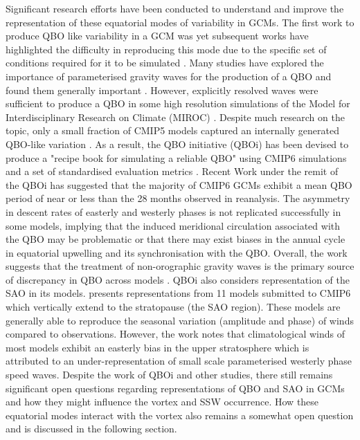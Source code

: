 Significant research efforts have been conducted to understand and improve the representation of these equatorial modes of variability in GCMs. The first work to produce QBO like variability in a GCM was \cite{takahashiSimulation1996} yet subsequent works have highlighted the difficulty in reproducing this mode due to the specific set of conditions required for it to be simulated \citep{Baldwin2001}. Many studies have explored the importance of parameterised gravity waves for the production of a QBO and found them generally important \citep{giorgettaClimatology2006,ospreyClimatology2010b}. However, explicitly resolved waves were sufficient to produce a QBO in some high resolution simulations of the Model for Interdisciplinary Research on Climate (MIROC) \citep{kawataniQuasiBiennial2011}. Despite much research on the topic, only a small fraction of CMIP5 models captured an internally generated QBO-like variation \citep{charlton-perezLack2013}. As a result, the QBO initiative (QBOi) has been devised to produce a "recipe book for simulating a reliable QBO" using CMIP6 simulations and a set of standardised evaluation metrics \citep{butchartOverview2018}. Recent Work under the remit of the QBOi \citep{bushellEvaluation2020b} has suggested that the majority of CMIP6 GCMs exhibit a mean QBO period of near or less than the 28 months observed in reanalysis. The asymmetry in descent rates of easterly and westerly phases is not replicated successfully in some models, implying that the induced meridional circulation associated with the QBO may be problematic or that there may exist biases in the annual cycle in equatorial upwelling and its synchronisation with the QBO. Overall, the work suggests that the treatment of non-orographic gravity waves is the primary source of discrepancy in QBO across models \citep{bushellEvaluation2020b}. QBOi also considers representation of the SAO in its models. \cite{smithEquatoriala} presents representations from 11 models submitted to CMIP6 which vertically extend to the stratopause (the SAO region). These models are generally able to reproduce the seasonal variation (amplitude and phase) of winds compared to observations. However, the work notes that climatological winds of most models exhibit an easterly bias in the upper stratosphere which is attributed to an under-representation of small scale parameterised westerly phase speed waves. Despite the work of QBOi and other studies, there still remains significant open questions regarding representations of QBO and SAO in GCMs and how they might influence the vortex and SSW occurrence. How these equatorial modes interact with the vortex also remains a somewhat open question and is discussed in the following section. 

